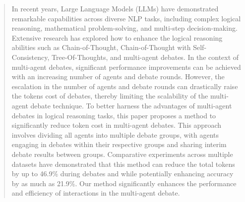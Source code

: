 \begin{abstract}
    In recent years, Large Language Models (LLMs) have demonstrated remarkable capabilities across diverse NLP tasks, including complex logical reasoning, mathematical problem-solving, and multi-step decision-making. Extensive research has explored how to enhance the logical reasoning abilities such as Chain-of-Thought, Chain-of-Thought with Self-Consistency, Tree-Of-Thoughts, and multi-agent debates. In the context of multi-agent debates, significant performance improvements can be achieved with an increasing number of agents and debate rounds. However, the escalation in the number of agents and debate rounds can drastically raise the tokens cost of debates, thereby limiting the scalability of the multi-agent debate technique. To better harness the advantages of multi-agent debates in logical reasoning tasks, this paper proposes a method to significantly reduce token cost in multi-agent debates. This approach involves dividing all agents into multiple debate groups, with agents engaging in debates within their respective groups and sharing interim debate results between groups. Comparative experiments across multiple datasets have demonstrated that this method can reduce the total tokens by up to 46.9\% during debates and while potentially enhancing accuracy by as much as 21.9\%. Our method significantly enhances the performance and efficiency of interactions in the multi-agent debate.
\end{abstract}